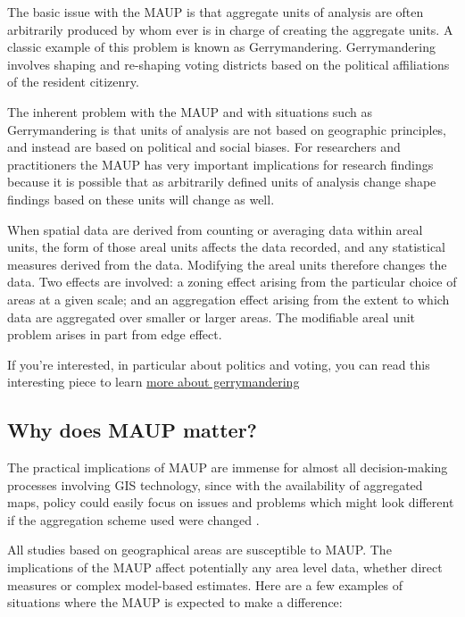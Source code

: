 \documentclass[]{book}
\begin{document}
The basic issue with the MAUP is that aggregate units of analysis are often arbitrarily produced by whom ever is in charge of creating the aggregate units. A classic example of this problem is known as Gerrymandering. Gerrymandering involves shaping and re-shaping voting districts based on the political affiliations of the resident citizenry.

The inherent problem with the MAUP and with situations such as Gerrymandering is that units of analysis are not based on geographic principles, and instead are based on political and social biases. For researchers and practitioners the MAUP has very important implications for research findings because it is possible that as arbitrarily defined units of analysis change shape findings based on these units will change as well.

When spatial data are derived from counting or averaging data within areal units, the form of those areal units affects the data recorded, and any statistical measures derived from the data. Modifying the areal units therefore changes the data. Two effects are involved: a zoning effect arising from the particular choice of areas at a given scale; and an aggregation effect arising from the extent to which data are aggregated over smaller or larger areas. The modifiable areal unit problem arises in part from edge effect.

If you're interested, in particular about politics and voting, you can read this interesting piece to learn \href{https://projects.fivethirtyeight.com/redistricting-maps/}{more about gerrymandering}

\hypertarget{why-does-maup-matter}{%
\subsection{Why does MAUP matter?}\label{why-does-maup-matter}}

The practical implications of MAUP are immense for almost all decision-making processes involving GIS technology, since with the availability of aggregated maps, policy could easily focus on issues and problems which might look different if the aggregation scheme used were changed .

All studies based on geographical areas are susceptible to MAUP. The implications of the MAUP affect potentially any area level data, whether direct measures or complex model-based estimates. Here are a few examples of situations where the MAUP is expected to make a difference:
\end{document}
